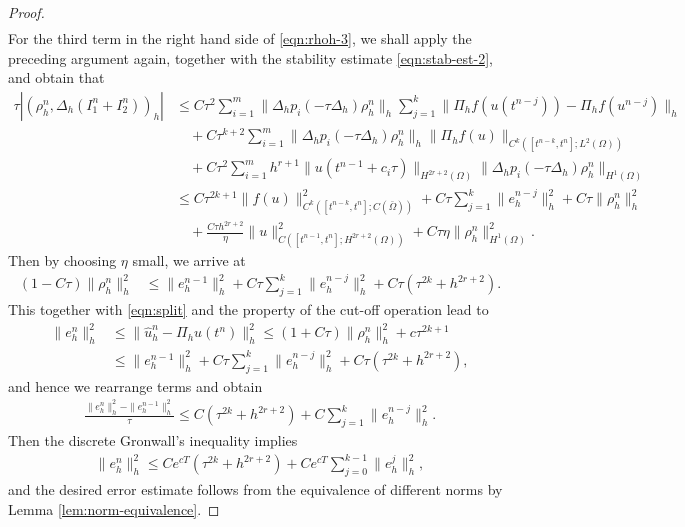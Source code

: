 \documentclass[a4paper, oneside]{book}
\def\II{(\Omega)}
\begin{document}
\begin{proof}
\begin{equation}
\begin{split}
\end{split}
 \end{equation}
For the third term in the right hand side of \eqref{eqn:rhoh-3}, we shall apply the preceding argument again, together with the stability estimate
\eqref{eqn:stab-est-2}, and obtain that
\begin{equation}\label{eqn:fully-I3}
\begin{split}
\tau |( \rho_h^n,\Delta_h (I_1^n+I_2^n))_h| &\le  C \tau^2 \sum_{i=1}^m \|\Delta_h p_i(-\tau \Delta_h)\rho_h^n \|_h  \sum_{j=1}^k  \|\Pi_hf(u(t^{n-j}))- \Pi_h f(u^{n-j})\|_h   \\
     &\quad+  C \tau^{k+2} \sum_{i=1}^m  \| \Delta_hp_i(-\tau \Delta_h)\rho_h^n \|_h  \|  \Pi_h f(u)  \|_{C^{k}([t^{n-k},t^n]; L^2\II)} \\
&\quad+ C\tau^2 \sum_{i=1}^m h^{r+1} \| u(t^{n-1}+c_i\tau)  \|_{H^{2r+2}(\Omega)} \| \Delta_h p_i(-\tau\Delta_h) \rho_h^n \|_{H^1\II} \\
 &\le C\tau^{2k+1} \|  f(u)  \|_{C^{k}([t^{n-k},t^n]; C(\bar\Omega))}^2 + C \tau \sum_{j=1}^k \|  e_h^{n-j}  \|_h^2 +  C\tau \|  \rho_h^n \|_h^2\\
&\quad+\frac{C \tau h^{2r+2}}{\eta}  \| u  \|_{C([t^{n-1},t^n];H^{2r+2}(\Omega))}^2 + C\tau \eta  \| \rho_h^n \|_{H^1\II}^2.
\end{split}
 \end{equation}
Then by choosing $\eta$ small, we arrive at
\begin{align*}
(1-C\tau) \| \rho_h^n \|_h^2 &\le  \|  e_h^{n-1} \|_h^2   + C \tau \sum_{j=1}^k  \|  e_h^{n-j} \|_h^2
+ C\tau (\tau^{2k} + h^{2r+2}).
\end{align*}
This together with \eqref{eqn:split} and the property of the cut-off operation lead to
\begin{align*}
\| e_h^n  \|_h^2 &\le \| \hat u_h^n - \Pi_h u(t^n) \|_h^2   \le (1+C\tau) \| \rho_h^n \|_h^2 + c\tau^{2k+1}\\
&\le\| e_h^{n-1}  \|_h^2 + C \tau \sum_{j=1}^k  \|  e_h^{n-j} \|_h^2  + C\tau (\tau^{2k} + h^{2r+2}),
\end{align*}
and hence we rearrange terms and obtain
\begin{align*}
\frac{\|  e_h^n \|_h^2 -  \|  e_h^{n-1} \|_h^2 }{\tau} \le  C (\tau^{2k} + h^{2r+2})  + C  \sum_{j=1}^k \|  e_h^{n-j}  \|_h^2.
\end{align*}
Then the discrete Gronwall's inequality implies
\begin{align*}
\|  e_h^n \|_h^2  \le  C e^{cT} (\tau^{2k}+h^{2r+2})  + C e^{cT}  \sum_{j=0}^{k-1} \|  e_h^{j}  \|_h^2,
\end{align*}
and the desired error estimate follows from the equivalence of different norms by Lemma \ref{lem:norm-equivalence}.
\end{proof}
\end{document}
